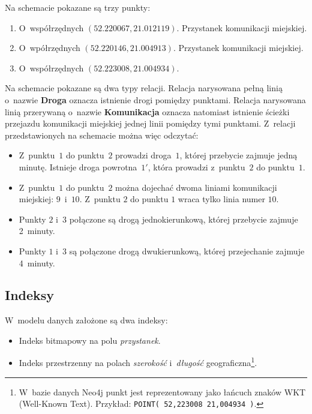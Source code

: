 \documentclass[a4paper,12pt]{article}
\begin{document}
	Na schemacie pokazane są trzy punkty:

	\begin{enumerate}
		\item O~współrzędnych $(52.220067,21.012119)$. Przystanek komunikacji miejskiej.
		\item O~wpółrzędnych $(52.220146,21.004913)$. Przystanek komunikacji miejskiej.
		\item O~współrzędnych $(52.223008,21.004934)$.
	\end{enumerate}

	Na schemacie pokazane są dwa typy relacji. Relacja narysowana pełną linią o~nazwie \textbf{Droga} oznacza istnienie drogi pomiędzy punktami. Relacja narysowana linią przerywaną o~nazwie \textbf{Komunikacja} oznacza natomiast istnienie ścieżki przejazdu komunikacji miejskiej jednej linii pomiędzy tymi punktami. Z~relacji przedstawionych na schemacie można więc odczytać:

	\begin{itemize}
		\item Z~punktu~$1$ do punktu~$2$ prowadzi droga~$1$, której przebycie zajmuje jedną minutę. Istnieje droga powrotna~$1'$, która prowadzi z~punktu~$2$ do punktu~$1$. 
		\item Z~punktu~$1$ do punktu~$2$ można dojechać dwoma liniami komunikacji miejskiej: $9$~i~$10$. Z~punktu $2$ do punktu $1$ wraca tylko linia numer $10$.
		\item Punkty $2$ i~$3$ połączone są drogą jednokierunkową, której przebycie zajmuje 2~minuty.
		\item Punkty $1$ i~$3$ są połączone drogą dwukierunkową, której przejechanie zajmuje 4~minuty.
	\end{itemize}

	\subsection*{Indeksy}

	W~modelu danych założone są dwa indeksy:

	\begin{itemize}
		\item Indeks bitmapowy na polu \emph{przystanek}.
		\item Indeks przestrzenny na polach \emph{szerokość} i~\emph{długość} geograficzna\footnote{W~bazie danych Neo4j punkt jest reprezentowany jako łańcuch znaków WKT (Well-Known Text). Przykład: \verb+POINT( 52,223008 21,004934 )+.}.
	\end{itemize}
\end{document}
